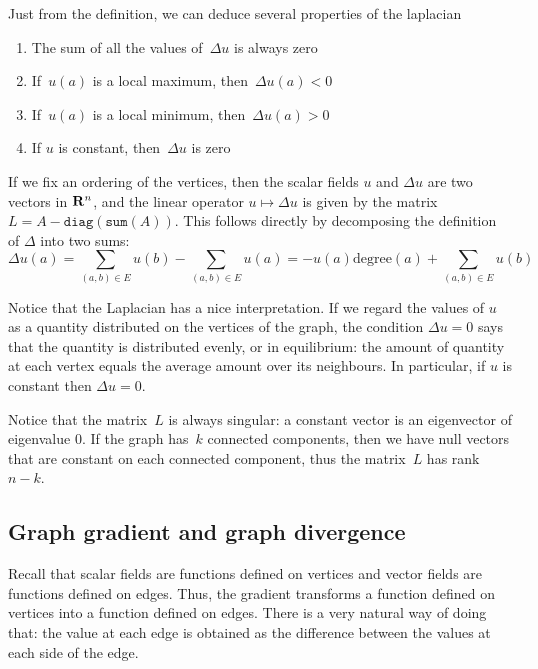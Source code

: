 Just from the definition, we can deduce several properties of the laplacian
\begin{enumerate}
	\item The sum of all the values of~$\Delta u$ is always zero
	\item If~$u(a)$ is a local maximum, then~$\Delta u(a)<0$
	\item If~$u(a)$ is a local minimum, then~$\Delta u(a)>0$
	\item If $u$ is constant, then~$\Delta u$ is zero
\end{enumerate}



If we fix an ordering of the vertices, then the scalar fields $u$ and $\Delta
u$ are two vectors in $\mathbf{R}^n$, and the linear operator $u\mapsto\Delta u$ is
given by the matrix $L=A-\mathtt{diag}(\mathtt{sum}(A))$.  This follows
directly by decomposing the definition of $\Delta$ into two sums:
\[
\Delta u(a)
=
\sum_{(a,b)\in E}
u(b)
-
\sum_{(a,b)\in E}
u(a)
=
-
u(a)\mathrm{degree}(a)
+\sum_{(a,b)\in E}
u(b)
\]


Notice that the Laplacian has a nice interpretation.
If we regard the values of $u$ as a quantity distributed on the vertices of
the graph, the condition $\Delta u = 0$ says that the quantity is distributed
evenly,  or in equilibrium: the amount of quantity at each vertex equals the
average amount over its neighbours.  In particular, if $u$ is constant then
$\Delta u = 0$.

Notice that the matrix~$L$ is always singular: a constant vector is an
eigenvector of eigenvalue 0.  If the graph has~$k$ connected components, then
we have null vectors that are constant on each connected component, thus the
matrix~$L$ has rank~$n-k$.


\subsection{Graph gradient and graph divergence}


Recall that scalar fields are functions defined on vertices and vector fields
are functions defined on edges.  Thus, the gradient transforms a function
defined on vertices into a function defined on edges.  There is a very
natural way of doing that: the value at each edge is obtained as the
difference between the values at each side of the edge.

